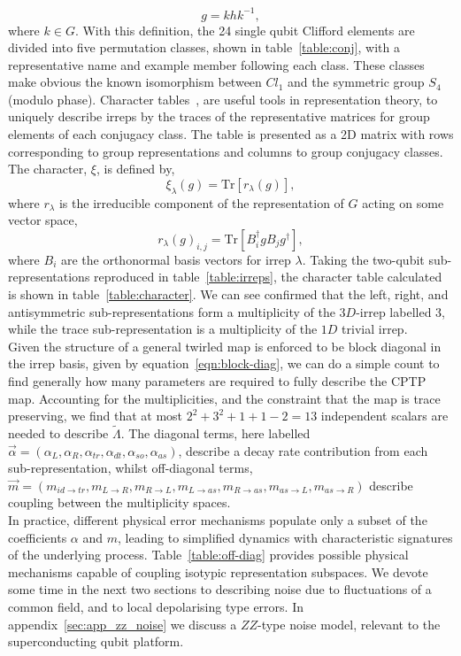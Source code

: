 \begin{equation}
g = khk^{-1},
\end{equation}
where $k\in G$. With this definition, the 24 single qubit Clifford elements are divided into five permutation classes, shown in table~\ref{table:conj}, with a representative name and example member following each class.
These classes make obvious the known isomorphism between $Cl_1$ and the symmetric group $S_4$ (modulo phase).
Character tables~\cite{lee_character_2025}, are useful tools in representation theory, to uniquely describe irreps 
by the traces of the representative matrices for group elements of each conjugacy class. The table is presented as a 2D matrix with rows corresponding to group representations and columns to group conjugacy classes. The character, $\xi$, is defined by,
\begin{equation}
\xi_\lambda(g) = \mathrm{Tr}[r_\lambda(g)],
\end{equation}
where $r_\lambda$ is the irreducible component of the representation of $G$ acting on some vector space,
\begin{equation}
r_\lambda(g)_{i,j} = \mathrm{Tr}[B_i^\dagger g B_j g^\dagger],
\end{equation}
where $B_i$ are the orthonormal basis vectors for irrep $\lambda$.
Taking the two-qubit sub-representations reproduced in table~\ref{table:irreps}, the character table calculated is shown in table~\ref{table:character}. We can see confirmed that the left, right, and antisymmetric sub-representations form a multiplicity of the $3D$-irrep labelled $3$, while the trace sub-representation is a multiplicity of the $1D$ trivial irrep.\\
Given the structure of a general twirled map is enforced to be block diagonal in the irrep basis, given by
equation~\ref{eqn:block-diag}, we can do a simple count to find generally how many parameters are required to fully describe the CPTP map. Accounting for the multiplicities, and the constraint that the map is trace preserving, we find that at most $2^2+ 3^2 + 1 + 1 - 2 = 13$ independent scalars are needed to
describe $\tilde\Lambda$. The diagonal terms, here labelled
$\vec\alpha=(
\alpha_{L}, 
\alpha_R, 
\alpha_{tr}, 
\alpha_{dt}, 
\alpha_{so},
\alpha_{as}
)$, describe a decay rate contribution from each
sub-representation, whilst off-diagonal terms, 
$\vec m=(
m_{id\rightarrow tr},
m_{L\rightarrow R},
m_{R\rightarrow L},
m_{L\rightarrow as},
m_{R\rightarrow as},
m_{as\rightarrow L},
m_{as\rightarrow R}
)$
describe coupling between the multiplicity spaces.\\
In practice, different physical error mechanisms populate only a subset of the coefficients $\alpha$ and $m$, leading to simplified dynamics with characteristic signatures of the underlying process. Table~\ref{table:off-diag} provides possible physical mechanisms capable of coupling isotypic representation subspaces. We devote some time in the next two sections to describing noise due to fluctuations of a common field, and to local depolarising type errors. In appendix~\ref{sec:app_zz_noise} we discuss a $ZZ$-type noise model, relevant to the superconducting qubit platform.

